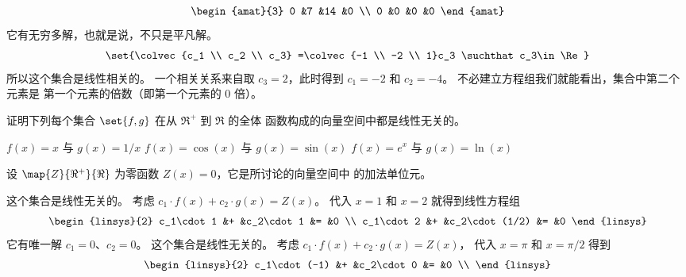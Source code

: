\begin{exercises}
\begin{answer}
\begin{exparts}
\begin{align*}
\begin{amat}{3}
            0  &7   &14  &0  \\
            0  &0   &0   &0
         \end{amat}
       \end{align*}
       它有无穷多解，也就是说，不只是平凡解。
       \begin{equation*}
         \set{\colvec{c_1 \\ c_2 \\ c_3}
              =\colvec{-1 \\ -2 \\ 1}c_3
              \suchthat c_3\in\Re}
       \end{equation*}
       所以这个集合是线性相关的。
       一个相关关系来自取 $c_3=2$，此时得到 $c_1=-2$ 和 $c_2=-4$。
      \partsitem   不必建立方程组我们就能看出，集合中第二个元素是
        第一个元素的倍数（即第一个元素的 $0$ 倍）。
      \end{exparts}
    \end{answer}
  \recommended \item
    证明下列每个集合 \( \set{f,g} \) 在从 \( \Re^+ \) 到 \( \Re \) 的全体
    函数构成的向量空间中都是线性无关的。
    \begin{exparts}
      \partsitem \( f(x)=x \) 与 \( g(x)=1/x \)
      \partsitem \( f(x)=\cos(x) \) 与 \( g(x)=\sin(x) \)
      \partsitem \( f(x)=e^x \) 与 \( g(x)=\ln(x) \)
    \end{exparts}
    \begin{answer}
      设 $\map{Z}{\Re^+}{\Re}$ 为零函数 $Z(x)=0$，它是所讨论的向量空间中
      的加法单位元。
      \begin{exparts}
        \partsitem 这个集合是线性无关的。
          考虑 \( c_1\cdot f(x)+c_2\cdot g(x)=Z(x) \)。
          代入 \( x=1 \) 和 \( x=2 \) 就得到线性方程组
          \begin{equation*}
            \begin{linsys}{2}
              c_1\cdot 1  &+  &c_2\cdot 1     &=  &0  \\
              c_1\cdot 2  &+  &c_2\cdot (1/2) &=  &0
            \end{linsys}
          \end{equation*}
          它有唯一解 \( c_1=0 \)、\( c_2=0 \)。
        \partsitem 这个集合是线性无关的。
          考虑 \( c_1\cdot f(x)+c_2\cdot g(x)=Z(x) \)，
          代入 \( x=\pi \) 和 \( x=\pi/2 \) 得到
          \begin{equation*}
            \begin{linsys}{2}
              c_1\cdot (-1)  &+  &c_2\cdot 0     &=  &0  \\

\end{linsys}
\end{equation*}
\end{exparts}
\end{answer}
\end{exercises}

